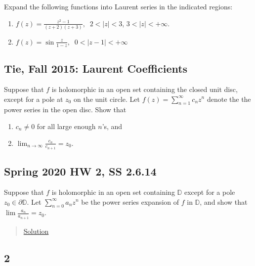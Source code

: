 Expand the following functions into Laurent series in the indicated
regions:

\begin{enumerate}
\def\labelenumi{(\alph{enumi})}
\item
  \(\displaystyle f(z) = \frac{z^2 - 1}{ (z+2)(z+3)}, \; \; 2 < |z| < 3\),
  \(3 < |z| < + \infty\).
\item
  \(\displaystyle f(z) = \sin \frac{z}{1-z}, \; \; 0 < |z-1| < + \infty\)
\end{enumerate}

\hypertarget{tie-fall-2015-laurent-coefficients}{%
\subsection{Tie, Fall 2015: Laurent
Coefficients}\label{tie-fall-2015-laurent-coefficients}}

Suppose that \(f\) is holomorphic in an open set containing the closed
unit disc, except for a pole at \(z_0\) on the unit circle. Let
\(\displaystyle f(z) = \sum_{n = 1}^\infty c_n z^n\) denote the the
power series in the open disc. Show that

\begin{enumerate}
\def\labelenumi{(\arabic{enumi})}
\item
  \(c_n \neq 0\) for all large enough \(n\)'s, and
\item
  \(\displaystyle \lim_{n \rightarrow \infty} \frac{c_n}{c_{n+1}}= z_0\).
\end{enumerate}

\hypertarget{spring-2020-hw-2-ss-2.6.14}{%
\subsection{Spring 2020 HW 2, SS
2.6.14}\label{spring-2020-hw-2-ss-2.6.14}}

Suppose that \(f\) is holomorphic in an open set containing
\({\mathbb{D}}\) except for a pole \(z_0 \in {{\partial}}{\mathbb{D}}\).
Let \(\sum_{n=0}^\infty a_n z^n\) be the power series expansion of \(f\)
in \({\mathbb{D}}\), and show that \(\lim \frac{a_n}{a_{n+1}} = z_0\).

\begin{quote}
\href{https://math.stackexchange.com/questions/1358964/show-that-lim-limits-n-fraca-na-n1-z-0?rq=1}{Solution}
\end{quote}

\hypertarget{section-14}{%
\subsection{2}\label{section-14}}

